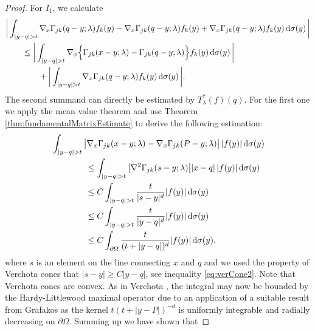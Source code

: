 \begin{proof}
   For $I_1$, we calculate
   \begin{align*}
     &\bigg| \int_{| y - q | > t} \nabla_x \Gamma_{j k} (q - y; \lambda) f_k(y) - \nabla_x \Gamma_{jk}(q - y; \lambda) f_k(y) + \nabla_x \Gamma_{jk}(q - y; \lambda) f_k(y) \, {\operatorname{d}\!{\sigma}}(y) \, \bigg| \\
     &\qquad\leq \bigg| \int_{|y - q| > t} \nabla_x \Big\{ \Gamma_{jk}(x - y; \lambda) -  \Gamma_{jk}(q - y; \lambda)\Big\} f_k(y) \, {\operatorname{d}\!{\sigma}}(y) \, \bigg| \\
     &\qquad\qquad+ \bigg| \int_{|y - q| > t} \nabla_x\Gamma_{jk}(q - y; \lambda) f_k(y) \, {\operatorname{d}\!{\sigma}}(y) \, \bigg|.
   \end{align*}
  The second summand can directly be estimated by $T_\lambda^*(f)(q)$.
  For the first one we apply the mean value theorem and use Theorem \ref{thm:fundamentalMatrixEstimate} to derive the following estimation:
  \begin{align*}
    &\int_{|y - q| > t} \big| \nabla_x\Gamma_{jk}(x - y; \lambda) - \nabla_x\Gamma_{jk}(P - y; \lambda) \big| \, |f(y)| \, {\operatorname{d}\!{\sigma}}(y) \\ 
    &\qquad\qquad\leq \int_{|y - q| > t} \big|\nabla^2 \Gamma_{jk}(s - y; \lambda)\big| |x - q|\, |f(y) | \, {\operatorname{d}\!{\sigma}}(y) \\
    &\qquad\qquad\leq C  \int_{|y - q| > t} \frac{t}{|s - y|^{d}} |f(y)| \, {\operatorname{d}\!{\sigma}}(y) \\
    &\qquad\qquad\leq C  \int_{|y - q| > t} \frac{t}{|y - q|^{d}} |f(y)| \, {\operatorname{d}\!{\sigma}}(y) \\
    &\qquad\qquad\leq C \int_{\partial\Omega} \frac{t}{(t + |y - q|)^d} |f(y)| \, {\operatorname{d}\!{\sigma}}(y),
  \end{align*}
  where $s$ is an element on the line connecting $x$ and $q$ and we used the property of Verchota cones that $|s - y| \geq C |y - q|$, see inequality \eqref{eq:verCone2}.
  Note that Verchota cones are convex.
  As in Verchota \cite[Lem 1.3]{verchota}, the integral may now be bounded by the Hardy-Littlewood maximal operator due to an application of a suitable result from Grafakos \cite[Thm. 2.1.10]{grafakos2014classical} as the kernel ${t}(t + |y - P|)^{-d}$ is uniformly integrable and radially decreasing on $\partial\Omega$.
  Summing up we have shown that

\end{proof}
